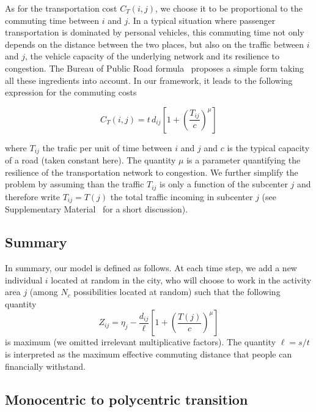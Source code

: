 As for the transportation cost $C_T(i,j)$, we choose it to be
proportional to the commuting time between $i$ and $j$. In a typical
situation where passenger transportation is dominated by personal
vehicles, this commuting time not only depends on the distance between
the two places, but also on the traffic between $i$ and $j$, the vehicle capacity of
the underlying network and its resilience to congestion. The Bureau of
Public Road formula~\cite{Branston:1976} proposes a simple form taking
all these ingredients into account. In our framework, it leads to the following expression for the 
commuting costs

\begin{equation}
    C_T(i,j) =  t\, d_{ij} \left[ 1 + \left( \frac{T_{ij}}{c} \right)^{\mu} \right]
    \label{eq:commuting_cost}
\end{equation}

where $T_{ij}$ the trafic per unit of time between $i$ and $j$ and $c$
is the typical capacity of a road (taken constant here). The quantity
$\mu$ is a parameter quantifying the resilience of the transportation
network to congestion. We further simplify the problem by assuming
than the traffic $T_{ij}$ is only a function of the subcenter $j$ and
therefore write $T_{ij}=T(j)$ the total traffic incoming in subcenter
$j$ (see Supplementary Material~\cite{SM} for a short discussion).

\subsection{Summary}
\label{sub:summary}


In summary, our model is defined as follows. At each time step, we add
a new individual $i$ located at random in the city, who will
choose to work in the activity area $j$ (among $N_c$ possibilities
located at random) such that the following quantity
%
\begin{equation}
Z_{ij} = \eta_j - \frac{d_{ij}}{\ell} \left[ 1 + \left( \frac{T(j)}{c} \right)^{\mu} \right]
\label{eq:cost_function}
\end{equation}
%
is maximum (we omitted irrelevant multiplicative factors). The quantity $\ell = s/t$ is interpreted as the maximum effective
commuting distance that people can financially withstand. 

\subsection{Monocentric to polycentric transition}
\label{sub:monocentric_to_polycentric_transition}

